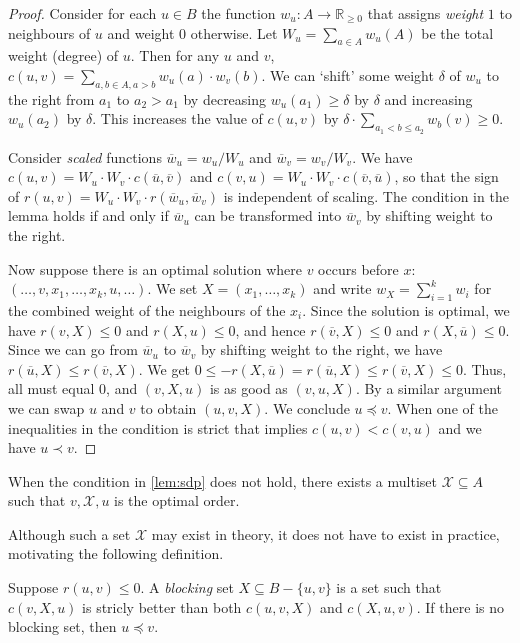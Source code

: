 \documentclass[a4paper,UKenglish,cleveref, autoref, thm-restate]{lipics-v2021}
\newcommand{\R}{\mathbb R}
\renewcommand{\b}{\prec}
\newcommand{\be}{\preceq}
\renewcommand{\u}{\overline{u}}
\renewcommand{\v}{\overline{v}}
\newcommand{\w}{\overline{w}}
\begin{document}
\begin{proof}
  Consider for each $u\in B$ the function $w_u: A\to \R_{\geq 0}$ that
  assigns \emph{weight} $1$ to neighbours of $u$ and weight $0$ otherwise.
  Let $W_u = \sum_{a\in A} w_u(A)$ be the total weight (degree) of $u$.
  Then for any $u$ and $v$, $c(u,v) = \sum_{a,b\in A, a>b} w_u(a) \cdot w_v(b)$.
  We can `shift' some weight $\delta$ of $w_u$ to the right from $a_1$ to $a_2>a_1$ by
  decreasing $w_u(a_1)\geq \delta$ by $\delta$ and increasing $w_u(a_2)$ by
  $\delta$.
  This increases the value of
  $c(u,v)$ by $\delta \cdot \sum_{a_1 < b \leq a_2} w_b(v)\geq 0$.

  Consider \emph{scaled} functions $\w_u = w_u / W_u$ and $\w_v = w_v / W_v$.
  We have $c(u,v) = W_u\cdot W_v\cdot c(\u, \v)$ and $c(v,u) = W_u\cdot
  W_v\cdot c(\v, \u)$, so that the sign of $r(u,v) = W_u\cdot W_v\cdot
  r(\w_u, \w_v)$ is independent of scaling.
  The condition in the lemma holds if and only if $\w_u$ can be transformed into
  $\w_v$ by shifting weight to the right.

  Now suppose there is an optimal solution where $v$ occurs before $x$:
  $(\dots, v, x_1, \dots, x_k, u, \dots)$.
  We set $X=(x_1,\dots, x_k)$ and write $w_X=\sum_{i=1}^k w_i$ for the combined weight of the
  neighbours of the $x_i$.
  Since the solution is optimal, we have $r(v,X) \leq 0$ and $r(X, u) \leq 0$,
  and hence $r(\v, X)\leq 0$ and $r(X, \u) \leq 0$.
  Since we can go from $\w_u$ to $\w_v$ by shifting weight to the right, we have
  $r(\u, X) \leq r(\v, X)$. We get $0 \leq -r(X, \u) = r(\u, X) \leq r(\v, X)
  \leq 0$. Thus, all must equal $0$, and $(v, X, u)$ is as good as $(v, u, X)$. By a
  similar argument we can swap $u$ and $v$ to obtain $(u, v, X)$. We conclude
  $u\be v$.
  When one of the inequalities in the condition is strict that implies $c(u,v) <
  c(v,u)$ and we have $u\b v$.
\end{proof}

\begin{remark}
  When the condition in \cref{lem:sdp} does not hold, there exists a multiset
  $\mathcal X\subseteq A$ such that $v, \mathcal X, u$ is the optimal order.
\end{remark}

Although such a set $\mathcal X$ may exist in theory, it does not have to exist in
practice, motivating the following definition.

\begin{lemma}\label{pdp}
  Suppose $r(u,v)\leq 0$.
  A \emph{blocking} set $X\subseteq B-\{u,v\}$ is a set such that $c(v,X,u)$ is
  stricly better than both $c(u,v,X)$ and $c(X,u,v)$.
  If there is no blocking set, then $u\be v$.
\end{lemma}
\end{document}
